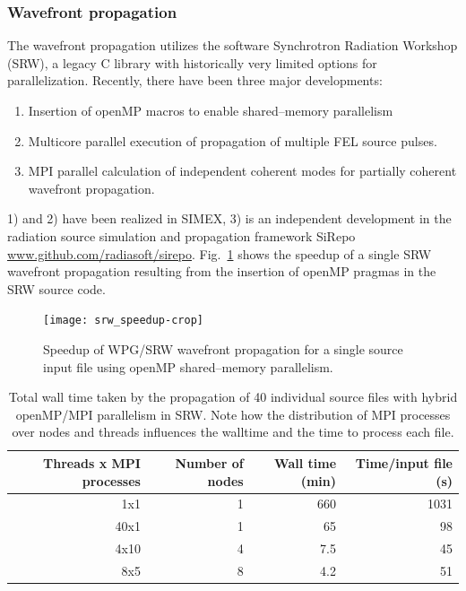 \documentclass[10pt]{scrartcl}
\begin{document}
\subsubsection{Wavefront propagation}
The wavefront propagation utilizes the software Synchrotron Radiation Workshop
(SRW), a legacy C library with historically very limited options for
parallelization. Recently, there have been three major developments:
\begin{enumerate}
  \item Insertion of openMP macros to enable shared--memory parallelism
  \item Multicore parallel execution of propagation of multiple FEL source
    pulses.
  \item MPI parallel calculation of independent coherent modes for partially
    coherent wavefront propagation.
\end{enumerate}
%
1) and 2) have been realized in SIMEX, 3) is an independent development in the radiation source
simulation and propagation framework SiRepo
\url{www.github.com/radiasoft/sirepo}. Fig.~\ref{fig:srw_speedup} shows the
speedup of a single SRW wavefront propagation resulting from the insertion of
openMP pragmas in the SRW source code.
%
\begin{figure}[ht]
  \begin{center}
    \texttt{[image: srw\_speedup-crop]}
  \end{center}
  \caption{Speedup of WPG/SRW wavefront propagation for a single source input
  file using openMP shared--memory parallelism.}
  \label{fig:srw_speedup}
\end{figure}
%
\begin{table}
  \centering
  \begin{tabular}{rrrr}
    \textbf{Threads x MPI processes} & \textbf{Number of nodes} &
    \textbf{Wall time (min)} & \textbf{Time/input file (s)} \\
    \hline
    1x1        & 1     & 660       &  1031 \\
    40x1       & 1     &  65       &    98 \\
    4x10       & 4     &   7.5     &    45 \\
    8x5        & 8     &   4.2     &    51 \\
  \end{tabular}
  \caption{Total wall time taken by the propagation of 40 individual source files with hybrid
  openMP/MPI parallelism in SRW. Note how the distribution of MPI processes over nodes
and threads influences the walltime and the time to process each file.}
  \label{tab:srw_hybrid_timings}
\end{table}
%
\end{document}
